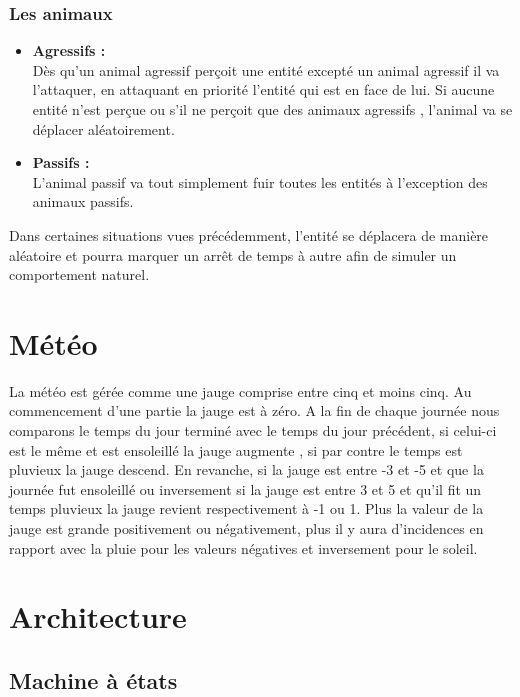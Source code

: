 \documentclass[a4paper]{article}
\newcommand{\alinea}{\hspace*{0.5cm}}
\begin{document}
		
		      \subsubsection{Les animaux}
		         \begin{itemize} \small
		             \item \textbf{Agressifs :} \\
			    \alinea Dès qu'un animal agressif perçoit une entité excepté un animal agressif il va l'attaquer, en attaquant en priorité l'entité qui est en face 
			    de lui. Si aucune entité n'est perçue ou s'il ne perçoit que des animaux agressifs , l'animal va se déplacer aléatoirement.
		             \item \textbf{Passifs :} \\
			    \alinea L'animal passif va tout simplement fuir toutes les entités à l'exception des animaux passifs.
		        \end{itemize} \normalsize 


Dans certaines situations vues précédemment, l’entité se déplacera de manière aléatoire et pourra marquer un arrêt de temps à autre afin de simuler un comportement naturel.
	
	\section{Météo}
	La météo est gérée comme une jauge comprise entre cinq et moins cinq. Au commencement d'une partie la jauge est à zéro.
	A la fin de chaque journée nous comparons le temps du jour terminé avec le temps du jour précédent, si celui-ci est le même  et est  ensoleillé la jauge augmente , si par contre le temps est pluvieux la jauge descend.
	En revanche, si la jauge est  entre -3 et -5 et que la journée fut ensoleillé ou inversement si la jauge est entre 3 et 5 et qu'il fit un temps pluvieux la jauge revient respectivement à -1 ou 1.
	Plus la valeur de la jauge est grande positivement ou négativement, plus il y aura d'incidences en rapport avec la pluie pour les valeurs négatives et inversement pour le soleil.
	
	\section{Architecture}
	
		\subsection{Machine à états}
\end{document}
